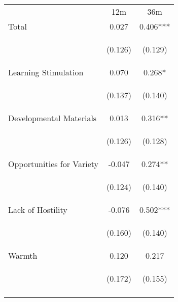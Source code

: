 \begin{tabular}{lcc}
\hline \noalign{\smallskip} & 12m & 36m\\
\noalign{\smallskip}\hline \noalign{\smallskip}Total & 0.027 & 0.406***\\
 & \begin{footnotesize}(0.126)\end{footnotesize} & \begin{footnotesize}(0.129)\end{footnotesize}\\
\noalign{\smallskip}Learning Stimulation & 0.070 & 0.268*\\
 & \begin{footnotesize}(0.137)\end{footnotesize} & \begin{footnotesize}(0.140)\end{footnotesize}\\
\noalign{\smallskip}Developmental Materials & 0.013 & 0.316**\\
 & \begin{footnotesize}(0.126)\end{footnotesize} & \begin{footnotesize}(0.128)\end{footnotesize}\\
\noalign{\smallskip}Opportunities for Variety & -0.047 & 0.274**\\
 & \begin{footnotesize}(0.124)\end{footnotesize} & \begin{footnotesize}(0.140)\end{footnotesize}\\
\noalign{\smallskip}Lack of Hostility & -0.076 & 0.502***\\
 & \begin{footnotesize}(0.160)\end{footnotesize} & \begin{footnotesize}(0.140)\end{footnotesize}\\
\noalign{\smallskip}Warmth & 0.120 & 0.217\\
 & \begin{footnotesize}(0.172)\end{footnotesize} & \begin{footnotesize}(0.155)\end{footnotesize}\\
\noalign{\smallskip}\hline\end{tabular}\\

